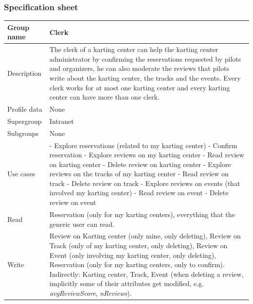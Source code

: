\documentclass{beamer}
\begin{document}
\begin{frame}
    \frametitle{Specification sheet}
    \begin{table}
        \tiny
        \begin{tabular}{|p{2cm}|p{6cm}|}
        \hline
        Group name & \textbf{Clerk} \\
        \hline
        Description & The clerk of a karting center can help the karting center administrator by confirming the reservations requested
        by pilots and organizers, he can also moderate the reviews that pilots write about the karting center, the tracks
        and the events. Every clerk works for at most one karting center and every karting center can have more than one clerk. \\
        \hline
        Profile data & None \\
        \hline
        Supergroup & Intranet \\
        \hline
        Subgroups & None \\
        \hline
        Use cases &
        - Explore reservations (related to my karting center) \newline
        - Confirm reservation \newline
        - Explore reviews on my karting center \newline
        - Read review on karting center \newline
        - Delete review on karting center\newline
        - Explore reviews on the tracks of my karting center \newline
        - Read review on track \newline
        - Delete review on track\newline
        - Explore reviews on events (that involved my karting center) \newline
        - Read review on event \newline
        - Delete review on event\\
        \hline
        Read & Reservation (only for my karting centers), everything 
        that the generic user can read. \\
        \hline
        Write & Review on Karting center (only mine, only deleting), Review on Track (only of my karting center, only deleting), 
        Review on Event (only involving my karting center, only deleting), Reservation (only for my karting centers, only to confirm). \newline
        Indirectly: Karting center, Track, Event (when deleting a review, implicitly some of their 
        attributes get modified, e.g. \textit{avgReviewScore}, \textit{nReviews}). \\
        \hline
        \end{tabular}
    \end{table}
\end{frame}
\end{document}
